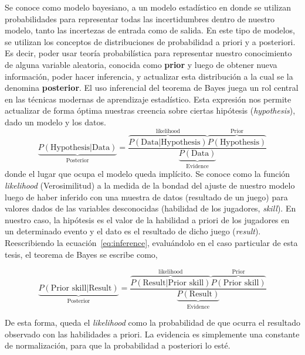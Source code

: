 \documentclass[11pt,twoside, spanish]{report} %
\begin{document}
Se conoce como modelo bayesiano, a un modelo estad\'istico en donde se utilizan probabilidades para representar todas las incertidumbres dentro de nuestro modelo, tanto las incertezas de entrada como de salida.
En este tipo de modelos, se utilizan los conceptos de distribuciones de probabilidad a priori y a posteriori.
Es decir, poder usar teor\'ia probabil\'istica para representar nuestro conocimiento de alguna variable aleatoria, conocida como \textbf{prior} y luego de obtener nueva informaci\'on, poder hacer inferencia, y actualizar esta distribuci\'on a la cual se la denomina \textbf{posterior}.
El uso inferencial del teorema de Bayes juega un rol central en las t\'ecnicas modernas de aprendizaje estad\'istico.
Esta expresi\'on nos permite actualizar de forma \'optima nuestras creencia sobre ciertas hip\'otesis (\textit{hypothesis}), dado un modelo y los datos.
%
\begin{equation}\label{eq:inference}
\underbrace{P(\text{Hypothesis}|\text{Data})}_{\text{Posterior}} = \frac{\overbrace{P(\text{Data}|\text{Hypothesis})}^{\text{likelihood}}\overbrace{P(\text{Hypothesis})}^{\text{Prior}}}{\underbrace{P(\text{Data})}_{\text{Evidence}}}
\end{equation}
%
donde el lugar que ocupa el modelo queda impl\'icito.
Se conoce como la funci\'on \textit{likelihood} (Verosimilitud) a la medida de la bondad del ajuste de nuestro modelo luego de haber inferido con una muestra de datos (resultado de un juego) para valores dados de las variables desconocidas (habilidad de los jugadores, \textit{skill}).
En nuestro caso, la hip\'otesis es el valor de la habilidad a priori de los jugadores en un determinado evento y el dato es el resultado de dicho juego (\textit{result}).
Reescribiendo la ecuaci\'on~\ref{eq:inference}, evalu\'andolo en el caso particular de esta tesis, el teorema de Bayes se escribe como,

\begin{equation}\label{eq:inferenceEvidence}
\underbrace{P(\text{Prior skill}|\text{Result})}_{\text{Posterior}} = \frac{\overbrace{P(\text{Result}|\text{Prior skill})}^{\text{likelihood}}\overbrace{P(\text{Prior skill})}^{\text{Prior}}}{\underbrace{P(\text{Result})}_{\text{Evidence}}}
\end{equation}


De esta forma, queda el \textit{likelihood} como la probabilidad de que ocurra el resultado observado con las habilidades a priori.
La evidencia es simplemente una constante de normalizaci\'on, para que la probabilidad a posteriori lo est\'e.
\end{document}
